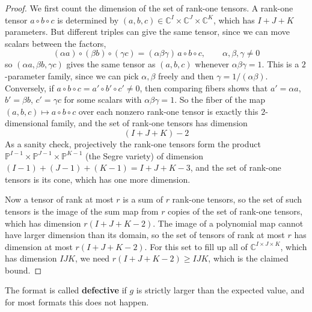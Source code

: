   \begin{proof}
    We first count the dimension of the set of rank-one tensors. A rank-one tensor $a \circ b \circ c$ is determined by $(a, b, c) \in \mathbb{C}^I \times \mathbb{C}^J \times \mathbb{C}^K$, which has $I + J + K$ parameters. But different triples can give the same tensor, since we can move scalars between the factors, 
    \begin{equation}
      (\alpha a) \circ (\beta b) \circ (\gamma c) = (\alpha \beta \gamma) \, a \circ b \circ c, \qquad \alpha, \beta, \gamma \neq 0
    \end{equation}
    so $(\alpha a, \beta b, \gamma c)$ gives the same tensor as $(a, b, c)$ whenever $\alpha \beta \gamma = 1$. This is a $2$-parameter family, since we can pick $\alpha, \beta$ freely and then $\gamma = 1/(\alpha\beta)$. Conversely, if $a \circ b \circ c = a' \circ b' \circ c' \neq 0$, then comparing fibers shows that $a' = \alpha a$, $b' = \beta b$, $c' = \gamma c$ for some scalars with $\alpha \beta \gamma = 1$. So the fiber of the map $(a, b, c) \mapsto a \circ b \circ c$ over each nonzero rank-one tensor is exactly this $2$-dimensional family, and the set of rank-one tensors has dimension 
    \begin{equation}
      (I + J + K) - 2
    \end{equation}
    As a sanity check, projectively the rank-one tensors form the product $\mathbb{P}^{I-1} \times \mathbb{P}^{J-1} \times \mathbb{P}^{K-1}$ (the Segre variety) of dimension $(I - 1) + (J - 1) + (K - 1) = I + J + K - 3$, and the set of rank-one tensors is its cone, which has one more dimension. 

    Now a tensor of rank at most $r$ is a sum of $r$ rank-one tensors, so the set of such tensors is the image of the sum map from $r$ copies of the set of rank-one tensors, which has dimension $r(I + J + K - 2)$. The image of a polynomial map cannot have larger dimension than its domain, so the set of tensors of rank at most $r$ has dimension at most $r(I + J + K - 2)$. For this set to fill up all of $\mathbb{C}^{I \times J \times K}$, which has dimension $IJK$, we need $r(I + J + K - 2) \geq IJK$, which is the claimed bound. 
  \end{proof}
  The format is called \textbf{defective} if $g$ is strictly larger than the expected value, and for most formats this does not happen. 

